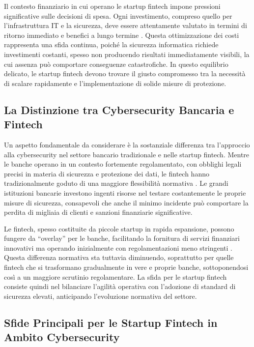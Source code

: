 \documentclass[a4paper,12pt]{report}
\begin{document}
Il contesto finanziario in cui operano le startup fintech impone pressioni significative sulle decisioni di spesa. Ogni investimento, compreso quello per l’infrastruttura IT e la sicurezza, deve essere attentamente valutato in termini di ritorno immediato e benefici a lungo termine \cite{fintechChallenges}. Questa ottimizzazione dei costi rappresenta una sfida continua, poiché la sicurezza informatica richiede investimenti costanti, spesso non producendo risultati immediatamente visibili, la cui assenza può comportare conseguenze catastrofiche. In questo equilibrio delicato, le startup fintech devono trovare il giusto compromesso tra la necessità di scalare rapidamente e l’implementazione di solide misure di protezione.

\subsection{La Distinzione tra Cybersecurity Bancaria e Fintech}

Un aspetto fondamentale da considerare è la sostanziale differenza tra l’approccio alla cybersecurity nel settore bancario tradizionale e nelle startup fintech. Mentre le banche operano in un contesto fortemente regolamentato, con obblighi legali precisi in materia di sicurezza e protezione dei dati, le fintech hanno tradizionalmente goduto di una maggiore flessibilità normativa \cite{bankingVsFintech}. Le grandi istituzioni bancarie investono ingenti risorse nel testare costantemente le proprie misure di sicurezza, consapevoli che anche il minimo incidente può comportare la perdita di migliaia di clienti e sanzioni finanziarie significative.

Le fintech, spesso costituite da piccole startup in rapida espansione, possono fungere da “overlay” per le banche, facilitando la fornitura di servizi finanziari innovativi ma operando inizialmente con regolamentazioni meno stringenti \cite{bankingVsFintech}. Questa differenza normativa sta tuttavia diminuendo, soprattutto per quelle fintech che si trasformano gradualmente in vere e proprie banche, sottoponendosi così a un maggiore scrutinio regolamentare. La sfida per le startup fintech consiste quindi nel bilanciare l’agilità operativa con l’adozione di standard di sicurezza elevati, anticipando l’evoluzione normativa del settore.

\subsection{Sfide Principali per le Startup Fintech in Ambito Cybersecurity}
\end{document}
